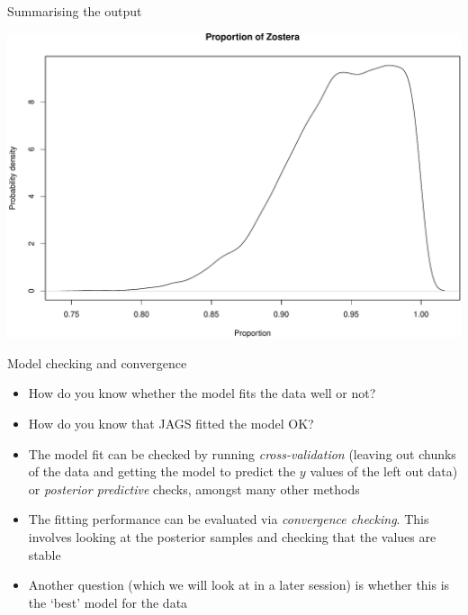 \documentclass[
  ignorenonframetext,
  aspectratio=169]{beamer}
\newenvironment{Shaded}{\begin{snugshade}}{\end{snugshade}}
\newcommand{\AttributeTok}[1]{\textcolor[rgb]{0.77,0.63,0.00}{#1}}
\newcommand{\DecValTok}[1]{\textcolor[rgb]{0.00,0.00,0.81}{#1}}
\newcommand{\FunctionTok}[1]{\textcolor[rgb]{0.00,0.00,0.00}{#1}}
\newcommand{\NormalTok}[1]{#1}
\newcommand{\SpecialCharTok}[1]{\textcolor[rgb]{0.00,0.00,0.00}{#1}}
\newcommand{\StringTok}[1]{\textcolor[rgb]{0.31,0.60,0.02}{#1}}
\providecommand{\tightlist}{%
  \setlength{\itemsep}{0pt}\setlength{\parskip}{0pt}}
\begin{document}
\begin{frame}[fragile]{Summarising the output}
\protect\hypertarget{summarising-the-output}{}
\small

\begin{Shaded}
\end{Shaded}

\begin{center}\includegraphics{reg_and_simms_files/figure-beamer/unnamed-chunk-12-1} \end{center}
\end{frame}

\begin{frame}{Model checking and convergence}
\protect\hypertarget{model-checking-and-convergence}{}
\begin{itemize}
\tightlist
\item
  How do you know whether the model fits the data well or not?
\item
  How do you know that JAGS fitted the model OK?
\item
  The model fit can be checked by running \emph{cross-validation}
  (leaving out chunks of the data and getting the model to predict the
  \(y\) values of the left out data) or \emph{posterior predictive}
  checks, amongst many other methods
\item
  The fitting performance can be evaluated via \emph{convergence
  checking}. This involves looking at the posterior samples and checking
  that the values are stable
\item
  Another question (which we will look at in a later session) is whether
  this is the `best' model for the data
\end{itemize}
\end{frame}
\end{document}

